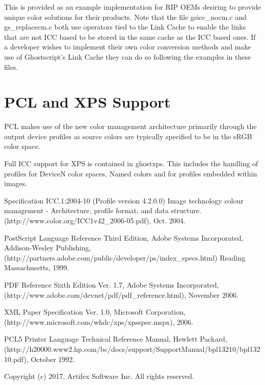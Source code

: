 \documentclass[12pt,notitlepage]{article}
\begin{document}
This is provided as an example implementation for RIP OEMs desiring to provide unique color solutions for their products.
Note that the file gsicc\_nocm.c and gs\_replacecm.c both use operators tied to the Link Cache to enable the links that are not ICC based to be stored in the same cache as the ICC based ones.  If a developer wishes to implement their own color conversion methods and make use of Ghostscript's Link Cache they can do so following the examples in these files.

\section{PCL and XPS Support}

PCL\cite{PCL} makes use of the new color management architecture primarily through the output device profiles as source colors are typically specified to be in the sRGB color space.

Full ICC support for XPS\cite{XPS} is contained in ghostxps. This includes the handling of profiles for DeviceN color spaces, Named colors and for profiles embedded within images.

\begin{thebibliography}{99}

 Specification ICC.1:2004-10 (Profile version 4.2.0.0) Image technology colour management - Architecture, profile format, and data structure.
(http://www.color.org/ICC1v42\_2006-05.pdf), Oct. 2004.

 PostScript Language Reference Third Edition, Adobe Systems Incorporated, Addison-Wesley Publishing, (http://partners.adobe.com/public/developer/ps/index\_specs.html)
Reading Massachusetts, 1999.

 PDF Reference Sixth Edition Ver. 1.7, Adobe Systems Incorporated, (http://www.adobe.com/devnet/pdf/pdf\_reference.html), November 2006.

 XML Paper Specification Ver. 1.0, Microsoft Corporation, (http://www.microsoft.com/whdc/xps/xpsspec.mspx), 2006.

 PCL5 Printer Language Technical Reference Manual, Hewlett Packard, (http://h20000.www2.hp.com/bc/docs/support/SupportManual/bpl13210/bpl13210.pdf), October 1992.

\end{thebibliography}

\vspace*{1.25in}
Copyright (c) 2017, Artifex Software Inc. All rights reserved.
\end{document}
